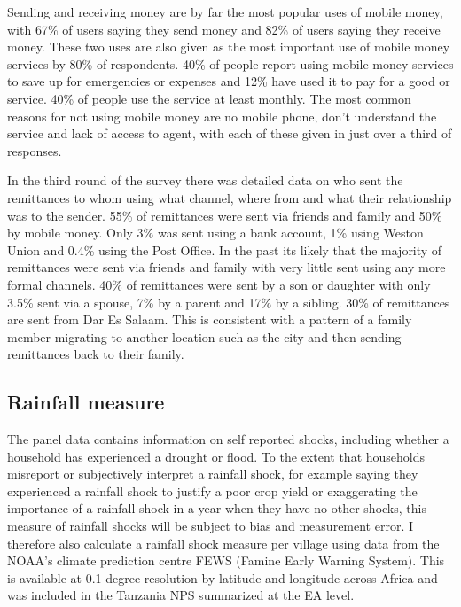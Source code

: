 Sending and receiving money are by far the most popular uses of mobile money, with 67\% of users saying they send money and 82\% of users saying they receive money. These two uses are also given as the most important use of mobile money services by 80\% of respondents. 40\% of people report using mobile money services to save up for emergencies or expenses and 12\% have used it to pay for a good or service. 40\% of people use the service at least monthly. The most common reasons for not using mobile money are no mobile phone, don't understand the service and lack of access to agent, with each of these given in just over a third of responses.  

In the third round of the survey there was detailed data on who sent the remittances to whom using what channel, where from and what their relationship was to the sender. 55\% of remittances were sent via friends and family and 50\% by mobile money. Only 3\% was sent using a bank account, 1\% using Weston Union and 0.4\% using the Post Office. In the past its likely that the majority of remittances were sent via friends and family with very little sent using any more formal channels. 40\% of remittances were sent by a son or daughter with only 3.5\% sent via a spouse, 7\% by a parent and 17\% by a sibling. 30\% of remittances are sent from Dar Es Salaam. This is consistent with a pattern of a family member migrating to another location such as the city and then sending remittances back to their family. 


\subsection{Rainfall measure}
The panel data contains information on self reported shocks, including whether a household has experienced a drought or flood. To the extent that households misreport or subjectively interpret a rainfall shock, for example saying they experienced a rainfall shock to justify a poor crop yield or exaggerating the importance of a rainfall shock in a year when they have no other shocks, this measure of rainfall shocks will be subject to bias and measurement error. I therefore also calculate a rainfall shock measure per village using data from the NOAA's climate prediction centre FEWS (Famine Early Warning System). This is available at 0.1 degree resolution by latitude and longitude across Africa and was included in the Tanzania NPS summarized at the EA level. 

